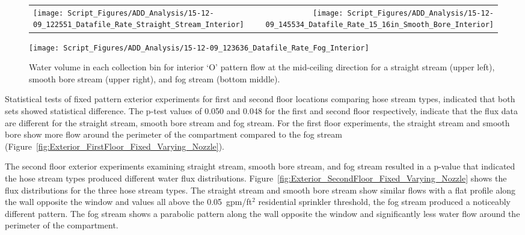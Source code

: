 \documentclass[12pt,oneside]{book}
\begin{document}
\begin{figure}[ht]
\begin{tabular*}{\textwidth}{lr}
\texttt{[image: Script\_Figures/ADD\_Analysis/15-12-09\_122551\_Datafile\_Rate\_Straight\_Stream\_Interior]} &
\texttt{[image: Script\_Figures/ADD\_Analysis/15-12-09\_145534\_Datafile\_Rate\_15\_16in\_Smooth\_Bore\_Interior]} \\
\end{tabular*}
\centering
\texttt{[image: Script\_Figures/ADD\_Analysis/15-12-09\_123636\_Datafile\_Rate\_Fog\_Interior]}
\caption[Water Flux for Varying Interior `O' Pattern Hose Stream Types]{Water volume in each collection bin for interior `O' pattern flow at the mid-ceiling direction for a straight stream (upper left), smooth bore stream (upper right), and fog stream (bottom middle).}
\label{fig:Interior_Varying_Nozzle_Types_O_Pattern}
\end{figure}

\clearpage

Statistical tests of fixed pattern exterior experiments for first and second floor locations comparing hose stream types, indicated that both sets showed statistical difference. The p-test values of 0.050 and 0.048  for the first and second floor respectively, indicate that the flux data are different for the straight stream, smooth bore stream and fog stream. For the first floor experiments, the straight stream and smooth bore show more flow around the perimeter of the compartment compared to the fog stream (Figure~\ref{fig:Exterior_FirstFloor_Fixed_Varying_Nozzle}).

The second floor exterior experiments examining straight stream, smooth bore stream, and fog stream resulted in a p-value that indicated the hose stream types produced different water flux distributions. Figure~\ref{fig:Exterior_SecondFloor_Fixed_Varying_Nozzle} shows the flux distributions for the three hose stream types. The straight stream and smooth bore stream show similar flows with a flat profile along the wall opposite the window and values all above the 0.05~gpm/ft$^2$ residential sprinkler threshold, the fog stream produced a noticeably different pattern. The fog stream shows a parabolic pattern along the wall opposite the window and significantly less water flow around the perimeter of the compartment. 
\end{document}
